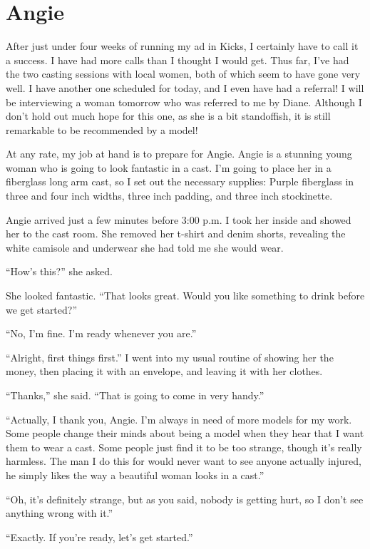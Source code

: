 \chapter{Angie}
    After just under four weeks of running my ad in Kicks, I certainly have to call it a
success. I have had more calls than I thought I would get. Thus far, I've had the two casting
sessions with local women, both of which seem to have gone very well. I have another one
scheduled for today, and I even have had a referral! I will be interviewing a woman tomorrow who
was referred to me by Diane. Although I don't hold out much hope for this one, as she is a bit
standoffish, it is still remarkable to be recommended by a model!

At any rate, my job at hand is to prepare for Angie. Angie is a stunning young woman who is
going to look fantastic in a cast. I'm going to place her in a fiberglass long arm cast, so I
set out the necessary supplies: Purple fiberglass in three and four inch widths, three inch
padding, and three inch stockinette.

Angie arrived just a few minutes before 3:00 p.m. I took her inside and showed her to the cast
room. She removed her t-shirt and denim shorts, revealing the white camisole and underwear she
had told me she would wear.

``How's this?'' she asked.

She looked fantastic. ``That looks great. Would you like something to drink before we get
started?''

``No, I'm fine. I'm ready whenever you are.''

``Alright, first things first.'' I went into my usual routine of showing her the money, then
placing it with an envelope, and leaving it with her clothes.

``Thanks,'' she said. ``That is going to come in very handy.''

``Actually, I thank you, Angie. I'm always in need of more models for my work. Some people
change their minds about being a model when they hear that I want them to wear a cast. Some
people just find it to be too strange, though it's really harmless. The man I do this for would
never want to see anyone actually injured, he simply likes the way a beautiful woman looks in a
cast.''

``Oh, it's definitely strange, but as you said, nobody is getting hurt, so I don't see anything
wrong with it.''

``Exactly. If you're ready, let's get started.''

